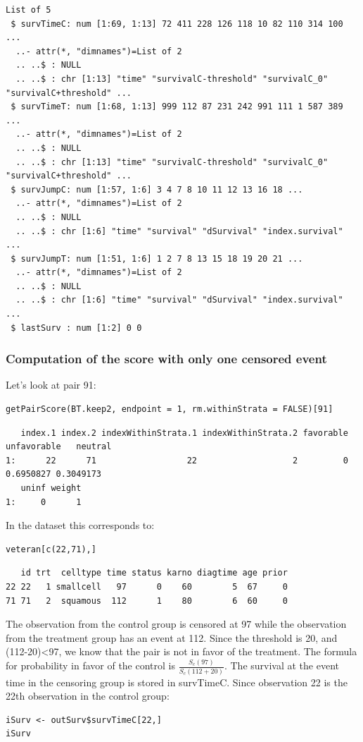 \documentclass[12pt]{article}
\begin{document}
\begin{verbatim}
List of 5
 $ survTimeC: num [1:69, 1:13] 72 411 228 126 118 10 82 110 314 100 ...
  ..- attr(*, "dimnames")=List of 2
  .. ..$ : NULL
  .. ..$ : chr [1:13] "time" "survivalC-threshold" "survivalC_0" "survivalC+threshold" ...
 $ survTimeT: num [1:68, 1:13] 999 112 87 231 242 991 111 1 587 389 ...
  ..- attr(*, "dimnames")=List of 2
  .. ..$ : NULL
  .. ..$ : chr [1:13] "time" "survivalC-threshold" "survivalC_0" "survivalC+threshold" ...
 $ survJumpC: num [1:57, 1:6] 3 4 7 8 10 11 12 13 16 18 ...
  ..- attr(*, "dimnames")=List of 2
  .. ..$ : NULL
  .. ..$ : chr [1:6] "time" "survival" "dSurvival" "index.survival" ...
 $ survJumpT: num [1:51, 1:6] 1 2 7 8 13 15 18 19 20 21 ...
  ..- attr(*, "dimnames")=List of 2
  .. ..$ : NULL
  .. ..$ : chr [1:6] "time" "survival" "dSurvival" "index.survival" ...
 $ lastSurv : num [1:2] 0 0
\end{verbatim}

\subsubsection{Computation of the score with only one censored event}
\label{sec:org9d8c009}

Let's look at pair 91:
\lstset{language=r,label= ,caption= ,captionpos=b,numbers=none}
\begin{lstlisting}
getPairScore(BT.keep2, endpoint = 1, rm.withinStrata = FALSE)[91]
\end{lstlisting}

\begin{verbatim}
   index.1 index.2 indexWithinStrata.1 indexWithinStrata.2 favorable unfavorable   neutral
1:      22      71                  22                   2         0   0.6950827 0.3049173
   uninf weight
1:     0      1
\end{verbatim}


In the dataset this corresponds to:
\lstset{language=r,label= ,caption= ,captionpos=b,numbers=none}
\begin{lstlisting}
veteran[c(22,71),]
\end{lstlisting}

\begin{verbatim}
   id trt  celltype time status karno diagtime age prior
22 22   1 smallcell   97      0    60        5  67     0
71 71   2  squamous  112      1    80        6  60     0
\end{verbatim}


The observation from the control group is censored at 97 while the
observation from the treatment group has an event at 112. Since the
threshold is 20, and (112-20)<97, we know that the pair is not in
favor of the treatment. The formula for probability in favor of the
control is \(\frac{S_c(97)}{S_c(112+20)}\). The survival at the event
time in the censoring group is stored in survTimeC. Since observation
22 is the 22th observation in the control group:
\lstset{language=r,label= ,caption= ,captionpos=b,numbers=none}
\begin{lstlisting}
iSurv <- outSurv$survTimeC[22,] 
iSurv
\end{lstlisting}
\end{document}
